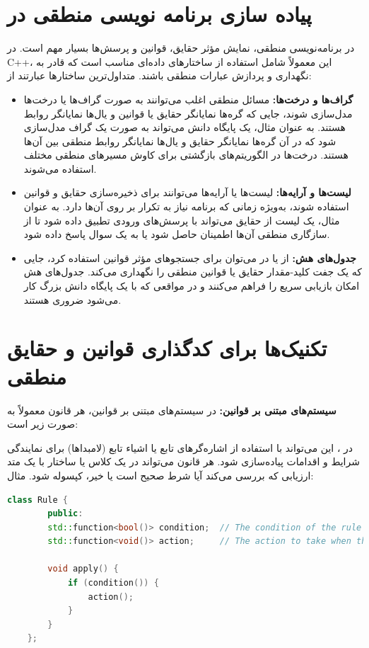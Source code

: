 \documentclass[12pt, a4paper]{report}
\begin{document}
\section{پیاده سازی برنامه نویسی منطقی در }
در برنامه‌نویسی منطقی، نمایش مؤثر حقایق، قوانین و پرسش‌ها بسیار مهم است. در C++، این معمولاً شامل استفاده از ساختارهای داده‌ای مناسب است که قادر به نگهداری و پردازش عبارات منطقی باشند. متداول‌ترین ساختارها عبارتند از:
\begin{itemize}
	\item \textbf{گراف‌ها و درخت‌ها:} مسائل منطقی اغلب می‌توانند به صورت گراف‌ها یا درخت‌ها مدل‌سازی شوند، جایی که گره‌ها نمایانگر حقایق یا قوانین و یال‌ها نمایانگر روابط هستند. به عنوان مثال، یک پایگاه دانش می‌تواند به صورت یک گراف مدل‌سازی شود که در آن گره‌ها نمایانگر حقایق و یال‌ها نمایانگر روابط منطقی بین آن‌ها هستند. درخت‌ها در الگوریتم‌های بازگشتی برای کاوش مسیرهای منطقی مختلف استفاده می‌شوند.
	
	\item \textbf{لیست‌ها و آرایه‌ها:} لیست‌ها یا آرایه‌ها می‌توانند برای ذخیره‌سازی حقایق و قوانین استفاده شوند، به‌ویژه زمانی که برنامه نیاز به تکرار بر روی آن‌ها دارد. به عنوان مثال، یک لیست از حقایق می‌تواند با پرسش‌های ورودی تطبیق داده شود تا از سازگاری منطقی آن‌ها اطمینان حاصل شود یا به یک سوال پاسخ داده شود.
	
	\item \textbf{جدول‌های هش:} از  یا  در  می‌توان برای جستجوهای مؤثر قوانین استفاده کرد، جایی که یک جفت کلید-مقدار حقایق یا قوانین منطقی را نگهداری می‌کند. جدول‌های هش امکان بازیابی سریع را فراهم می‌کنند و در مواقعی که با یک پایگاه دانش بزرگ کار می‌شود ضروری هستند.
	
\end{itemize}

\section{تکنیک‌ها برای کدگذاری قوانین و حقایق منطقی}

\textbf{سیستم‌های مبتنی بر قوانین:}  در سیستم‌های مبتنی بر قوانین، هر قانون معمولاً به صورت زیر است:

\LTR
{}
\RTL

 در ، این می‌تواند با استفاده از اشاره‌گرهای تابع یا اشیاء تابع (لامبداها) برای نمایندگی شرایط و اقدامات پیاده‌سازی شود. هر قانون می‌تواند در یک کلاس یا ساختار با یک متد ارزیابی که بررسی می‌کند آیا شرط صحیح است یا خیر، کپسوله شود. مثال:
 \begin{LTR}
 	\begin{lstlisting}[language=C++, breaklines=true]
 	class Rule {
 		public:
 		std::function<bool()> condition;  // The condition of the rule
 		std::function<void()> action;     // The action to take when the rule is applied
 		
 		void apply() {
 			if (condition()) {
 				action();
 			}
 		}
 	};
 	
 	\end{lstlisting}
 \end{LTR}
 
\end{document}
